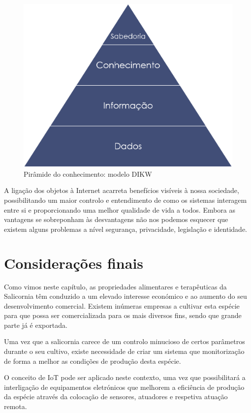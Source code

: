 \begin{figure}[!htb]
	\centering
	\includegraphics[scale=0.3]{img/cap3-iot/dikw.png}
	\caption{Pirâmide do conhecimento: modelo DIKW}
	\label{dikw1}
\end{figure}



A ligação dos objetos à Internet acarreta benefícios visíveis à nossa sociedade, possibilitando um maior controlo e entendimento de como os sistemas interagem entre si e proporcionando uma melhor qualidade de vida a todos. Embora as vantagens se sobreponham às desvantagens não nos podemos esquecer que existem alguns problemas a nível segurança, privacidade, legislação e identidade.



\section{Considerações finais}


Como vimos neste capítulo, as propriedades alimentares e terapêuticas da Salicornia têm conduzido a um elevado interesse económico e ao aumento do seu desenvolvimento comercial. Existem inúmeras empresas a cultivar esta espécie para que possa ser comercializada para os mais diversos fins, sendo que grande parte já é exportada.  %

Uma vez que a salicornia carece de um controlo minucioso de certos parâmetros durante o seu cultivo, existe necessidade de criar um sistema que monitorização de forma a melhor as condições de produção desta espécie. 

O conceito de \ac{IoT} pode ser aplicado neste contexto, uma vez que possibilitará a interligação de equipamentos eletrónicos que melhorem a eficiência de produção da espécie através da colocação de sensores, atuadores e respetiva atuação remota.  





